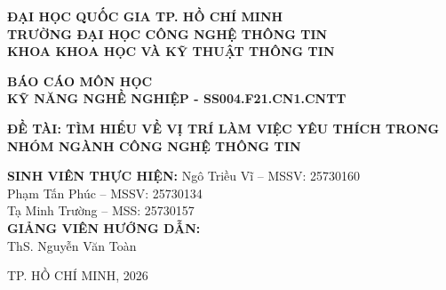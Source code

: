 \documentclass[12pt,a4paper]{article}
\begin{document}
\begin{titlepage}
    \begin{center}
        \textbf{ĐẠI HỌC QUỐC GIA TP. HỒ CHÍ MINH} \\
        \textbf{TRƯỜNG ĐẠI HỌC CÔNG NGHỆ THÔNG TIN} \\
        \textbf{KHOA KHOA HỌC VÀ KỸ THUẬT THÔNG TIN}
        \vspace{1cm}
        \begin{figure}[H]
            \centering
            
        \end{figure}
        
        \vspace{1cm}
   
        \Large\textbf{BÁO CÁO MÔN HỌC} \\
        \large\textbf{KỸ NĂNG NGHỀ NGHIỆP - SS004.F21.CN1.CNTT}
        
        \vspace{2cm}
        \Large\textbf{ĐỀ TÀI: TÌM HIỂU VỀ VỊ TRÍ LÀM VIỆC YÊU THÍCH TRONG NHÓM NGÀNH CÔNG NGHỆ THÔNG TIN}
        
        \vspace{3cm}
        \begin{center}
            \textbf{SINH VIÊN THỰC HIỆN:} Ngô Triều Vĩ – MSSV: 25730160 \\
            \hspace{7cm}
            Phạm Tấn Phúc – MSSV: 25730134 \\
            \hspace{7cm}
            Tạ Minh Trường – MSS: 25730157 \\
            \vspace{0.5cm}
            \textbf{GIẢNG VIÊN HƯỚNG DẪN:} \\
   
            ThS. Nguyễn Văn Toàn
        \end{center}
        
        \vfill
        TP. HỒ CHÍ MINH, 2026
    \end{center}
\end{titlepage}
\end{document}

